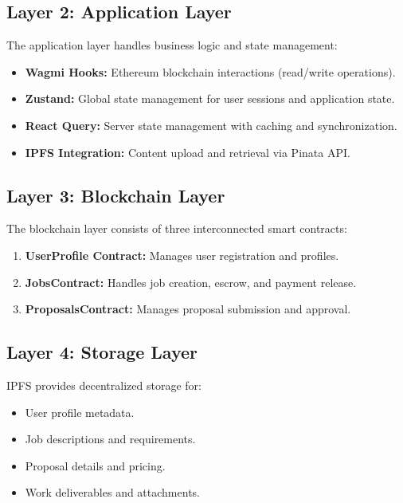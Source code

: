 \subsection{Layer 2: Application Layer}

The application layer handles business logic and state management:

\begin{itemize}
    \item \textbf{Wagmi Hooks:} Ethereum blockchain interactions (read/write operations).
    \item \textbf{Zustand:} Global state management for user sessions and application state.
    \item \textbf{React Query:} Server state management with caching and synchronization.
    \item \textbf{IPFS Integration:} Content upload and retrieval via Pinata API.
\end{itemize}

\subsection{Layer 3: Blockchain Layer}

The blockchain layer consists of three interconnected smart contracts:

\begin{enumerate}
    \item \textbf{UserProfile Contract:} Manages user registration and profiles.
    \item \textbf{JobsContract:} Handles job creation, escrow, and payment release.
    \item \textbf{ProposalsContract:} Manages proposal submission and approval.
\end{enumerate}

\subsection{Layer 4: Storage Layer}

IPFS provides decentralized storage for:

\begin{itemize}
    \item User profile metadata.
    \item Job descriptions and requirements.
    \item Proposal details and pricing.
    \item Work deliverables and attachments.
\end{itemize}

